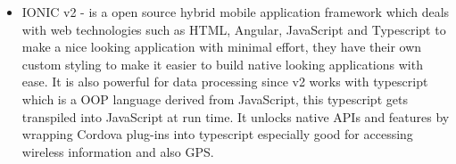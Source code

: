 \begin{itemize}
	
	\item IONIC v2 - is a open source hybrid mobile application framework which deals with web technologies such as HTML, Angular, JavaScript and Typescript to make a nice looking application with minimal effort, they have their own custom styling to make it easier to build native looking applications with ease. It is also powerful for data processing since v2 works with typescript which is a OOP language derived from JavaScript, this typescript gets transpiled into JavaScript at run time. It unlocks native APIs and features by wrapping Cordova plug-ins into typescript especially good for accessing wireless information and also GPS.
	
	
	
\end{itemize}
